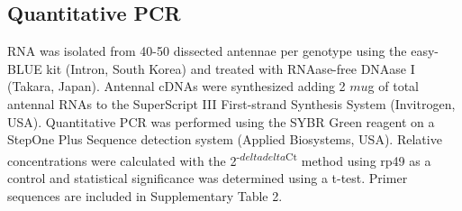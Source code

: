 \subsection*{Quantitative PCR}

RNA was isolated from 40-50 dissected antennae per genotype using the easy-BLUE kit (Intron, South Korea) and treated with RNAase-free DNAase I (Takara, Japan). Antennal cDNAs were synthesized adding 2 $mu$g of total antennal RNAs to the SuperScript III First-strand Synthesis System (Invitrogen, USA). Quantitative PCR was performed using the SYBR Green reagent on a StepOne Plus Sequence detection system (Applied Biosystems, USA). Relative concentrations were calculated with the 2\textsuperscript{-$delta$$delta$Ct} method using rp49 as a control and statistical significance was determined using a t-test. Primer sequences are included in Supplementary Table 2.
